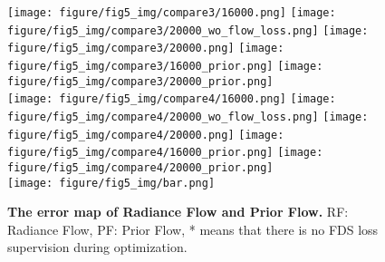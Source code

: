 \begin{figure}[t] \centering




    \texttt{[image: figure/fig5\_img/compare3/16000.png]}
    \texttt{[image: figure/fig5\_img/compare3/20000\_wo\_flow\_loss.png]}
    \texttt{[image: figure/fig5\_img/compare3/20000.png]}
    \texttt{[image: figure/fig5\_img/compare3/16000\_prior.png]}
    \texttt{[image: figure/fig5\_img/compare3/20000\_prior.png]}\\
    
    \texttt{[image: figure/fig5\_img/compare4/16000.png]}
    \texttt{[image: figure/fig5\_img/compare4/20000\_wo\_flow\_loss.png]}
    \texttt{[image: figure/fig5\_img/compare4/20000.png]}
    \texttt{[image: figure/fig5\_img/compare4/16000\_prior.png]}
    \texttt{[image: figure/fig5\_img/compare4/20000\_prior.png]}\\

    \texttt{[image: figure/fig5\_img/bar.png]}

    \caption{\textbf{The error map of Radiance Flow and Prior Flow.} RF: Radiance Flow, PF: Prior Flow, * means that there is no FDS loss supervision during optimization.}
    \label{fig:error_map}
\end{figure}




